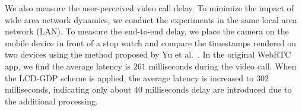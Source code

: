 We also measure the user-perceived video call delay.
To minimize the impact of wide area network dynamics, 
we conduct the experiments in the same local area network (LAN).
To measure the end-to-end delay, 
we place the camera on the mobile device in front of a stop watch
and compare the timestamps rendered on two devices using the method proposed by Yu et al.~\cite{6848080}. 
In the original WebRTC app, we find the average latency is $261$ milliseconds 
during the video call. When the LCD-GDP scheme is applied, the average latency
is increased to $302$ milliseconds, indicating only about $40$ milliseconds delay are
introduced due to the additional processing. 













